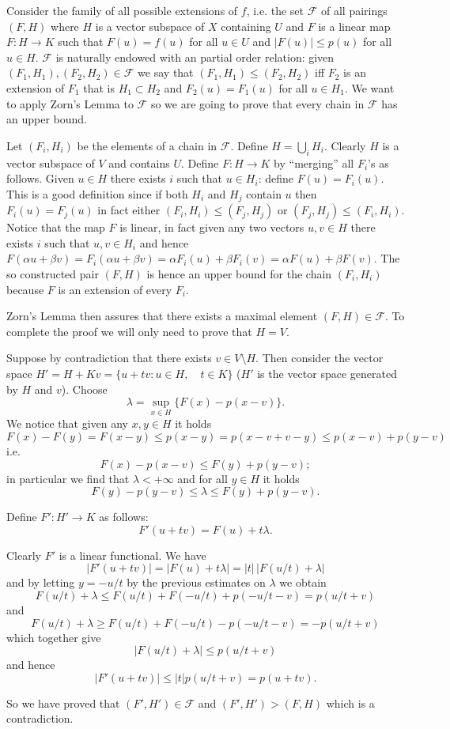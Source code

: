 \documentclass[12pt]{article}
\begin{document}
Consider the family of all possible extensions of $f$, i.e. the set $\mathcal F$ of all pairings $(F,H)$ where $H$ is a vector subspace of $X$ containing $U$ and $F$ is a linear map $F\colon H \to K$ such that $F(u)=f(u)$ for all $u\in U$ and $\vert F(u)\vert \le p(u)$ for all $u\in H$. 
$\mathcal F$ is naturally endowed with an partial order relation: given $(F_1,H_1),(F_2,H_2)\in \mathcal F$ we say 
that $(F_1,H_1)\le (F_2,H_2)$ iff $F_2$ is an extension of $F_1$ that is
$H_1\subset H_2$ and $F_2(u)=F_1(u)$ for all $u\in H_1$. 
We want to apply Zorn's Lemma to $\mathcal F$ so we are going to prove that every chain in $\mathcal F$ has an upper bound.

Let $(F_i,H_i)$ be the elements of a chain in $\mathcal F$. Define $H=\bigcup_i H_i$. Clearly $H$ is a vector subspace of $V$ and contains $U$. Define $F\colon H \to K$ by ``merging'' all $F_i$'s as follows. Given $u\in H$ there exists $i$ such that $u\in H_i$: define $F(u)=F_i(u)$. This is a good definition since if both $H_i$ and $H_j$ contain $u$ then $F_i(u)=F_j(u)$ in fact either $(F_i,H_i)\le (F_j,H_j)$ or $(F_j,H_j)\le (F_i,H_i)$.
Notice that the map $F$ is linear, in fact given any two vectors $u,v\in H$ there exists $i$ such that $u,v\in H_i$ and hence $F(\alpha u + \beta v) = F_i( \alpha u + \beta v) = \alpha F_i(u) + \beta F_i(v) =  \alpha F(u) + \beta F(v)$.
The so constructed pair $(F,H)$ is hence an upper bound for the chain 
$(F_i,H_i)$ because $F$ is an extension of every $F_i$. 

Zorn's Lemma then assures that there exists a maximal element $(F,H)\in \mathcal F$. To complete the proof we will only need to prove that $H=V$. 

Suppose by contradiction that there exists $v\in V\setminus H$. Then consider the vector space $H'= H+ Kv=\{ u+tv\colon
u\in H,\quad t\in K\}$ ($H'$ is the vector space generated by $H$ and $v$).
Choose 
\[
  \lambda = \sup_{x\in H}\{ F(x)-p(x-v)\}.
\]
We notice that given any $x,y\in H$ it holds
\[
  F(x)-F(y) = F(x-y) \le p(x-y) = p (x-v+v-y) \le p(x-v) + p(y-v) 
\]
i.e.
\[
  F(x)-p(x-v) \le F(y) + p(y-v);
\]
in particular we find that $\lambda < +\infty$ and for all $y\in H$ it holds
\[
  F(y)-p(y-v) \le \lambda \le F(y)+p(y-v).
\]

Define $F'\colon H'\to K$ as follows:
\[
  F'(u+tv) = F(u) + t\lambda.
\]

Clearly $F'$ is a linear functional.
We have
\[
 \lvert F'(u+tv)\rvert = \lvert F(u) + t\lambda \rvert 
= \lvert t\rvert \, \lvert F(u/t) + \lambda \rvert
\]
and by letting $y=-u/t$ by the previous estimates on $\lambda$ we obtain
\[
  F(u/t) + \lambda \le F(u/t) + F(-u/t) + p(-u/t-v ) = p(u/t+v)
\]
and
\[
  F(u/t) + \lambda \ge F(u/t) + F(-u/t) - p(-u/t -v) = -p(u/t+v)
\]
which together give
\[
  \lvert F(u/t) + \lambda \rvert \le p(u/t+v)
\]
and hence
\[
  \lvert F'(u+tv) \rvert \le \lvert t\rvert  p(u/t+v) = p(u+tv).
\]

So we have proved that $(F',H')\in\mathcal F$ and $(F',H')> (F,H)$  which is a contradiction.
\end{document}
